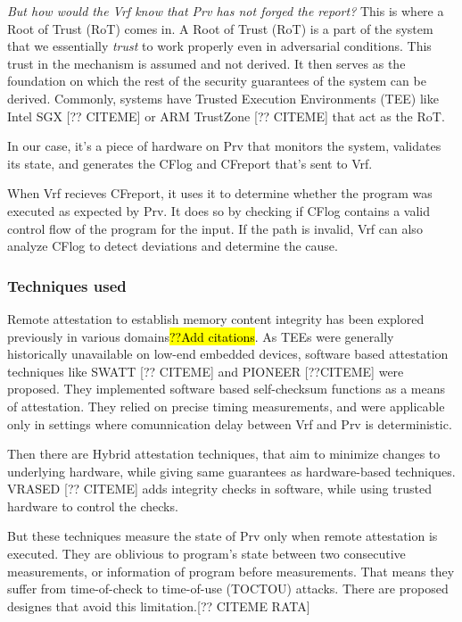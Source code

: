 \documentclass[a4paper, nobind]{templates/ociamthesis}
\begin{document}
\emph{But how would the Vrf know that Prv has not forged the report?}
This is where a Root of Trust (RoT) comes in.
A Root of Trust (RoT) is a part of the system that we essentially \emph{trust} to work
properly even in adversarial conditions. This trust in the mechanism is assumed and not derived.
It then serves as the foundation on which the rest of the security guarantees
of the system can be derived. Commonly, systems have Trusted Execution Environments
(TEE) like Intel SGX {[}?? CITEME{]} or ARM TrustZone {[}?? CITEME{]} that act as the RoT.

In our case, it's a piece of hardware on Prv that monitors the system, validates its state,
and generates the CFlog and CFreport that's sent to Vrf.

When Vrf recieves CFreport, it uses it to determine whether the program was executed as expected by Prv.
It does so by checking if CFlog contains a valid control flow of the program
for the input. If the path is invalid, Vrf can also analyze CFlog to detect
deviations and determine the cause.

\subsubsection{Techniques used}\label{cfatechniques}

Remote attestation to establish memory content integrity has been explored previously
in various domains\hl{??Add citations}.
As TEEs were generally historically unavailable on low-end embedded devices,
software based attestation techniques like SWATT {[}?? CITEME{]} and PIONEER {[}??CITEME{]} were proposed.
They implemented software based self-checksum functions as a means of attestation.
They relied on precise timing measurements, and were applicable only in settings where
comunnication delay between Vrf and Prv is deterministic.

Then there are Hybrid attestation techniques, that aim to minimize changes to
underlying hardware, while giving same guarantees as hardware-based techniques.
VRASED {[}?? CITEME{]} adds integrity checks in software, while using trusted hardware to control the checks.

But these techniques measure the state of Prv only when remote attestation is executed.
They are oblivious to program's state between two consecutive measurements, or
information of program before measurements. That means they suffer from
time-of-check to time-of-use (TOCTOU) attacks. There are proposed designes that avoid this limitation.{[}?? CITEME RATA{]}
\end{document}
